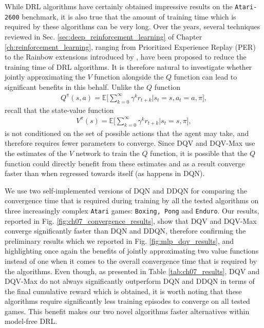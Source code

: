 While DRL algorithms have certainly obtained impressive results on the \texttt{Atari-2600} benchmark, it is also true that the amount of training time which is required by these algorithms can be very long. Over the years, several techniques reviewed in Sec. \ref{sec:deep_reinforcement_learning} of Chapter \ref{ch:reinforcement_learning}, ranging from Prioritized Experience Replay (PER) \cite{wang2016dueling} to the Rainbow extensions introduced by \citet{hessel2018rainbow}, have been proposed to reduce the training time of DRL algorithms. It is therefore natural to investigate whether jointly approximating the $V$ function alongside the $Q$ function can lead to significant benefits in this behalf. Unlike the $Q$ function
    \begin{align*}
	     Q^{\pi}(s,a)=\mathds{E}\bigg[\sum_{k=0}^{\infty}\gamma^{k}r_{t+k} \bigg| s_t = s, a_t=a, \pi\bigg],
    \end{align*}
recall that the state-value function
  \begin{align*}
	    V^{\pi}(s)=\mathds{E}\bigg[\sum_{k=0}^{\infty}\gamma^{k}r_{t+k}\bigg| s_t = s, \pi \bigg],
    \end{align*}
 is not conditioned on the set of possible actions that the agent may take, and therefore requires fewer parameters to converge. Since DQV and DQV-Max use the estimates of the $V$ network to train the $Q$ function, it is possible that the $Q$ function could directly benefit from these estimates and as a result converge faster than when regressed towards itself (as happens in DQN).

We use two self-implemented versions of DQN and DDQN for comparing the convergence time that is required during training by all the tested algorithms on three increasingly complex \texttt{Atari} games: \texttt{Boxing, Pong} and \texttt{Enduro}. Our results, reported in Fig. \ref{fig:ch07_convergence_results}, show that DQV and DQV-Max converge significantly faster than DQN and DDQN, therefore confirming the preliminary results which we reported in Fig. \ref{fig:mlp_dqv_results}, and highlighting once again the benefits of jointly approximating two value functions instead of one when it comes to the overall convergence time that is required by the algorithms. Even though, as presented in Table \ref{tab:ch07_results}, DQV and DQV-Max do not always significantly outperform DQN and DDQN in terms of the final cumulative reward which is obtained, it is worth noting that these algorithms require significantly less training episodes to converge on all tested games. This benefit makes our two novel algorithms faster alternatives within model-free DRL.


